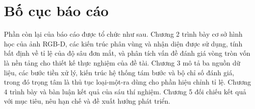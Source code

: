 \section{Bố cục báo cáo}

Phần còn lại của báo cáo được tổ chức như sau. Chương 2 trình bày cơ sở hình học của ảnh RGB-D, các kiến trúc phân vùng và nhận diện được sử dụng, tính bất định về tỉ lệ của độ sâu đơn mắt, và phân tích vấn đề đánh giá vòng tròn vốn là nền tảng cho thiết kế thực nghiệm của đề tài. Chương 3 mô tả ba nguồn dữ liệu, các bước tiền xử lý, kiến trúc hệ thống tám bước và bộ chỉ số đánh giá, trong đó trọng tâm là thủ tục loại-một-ra dùng cho phần hiệu chỉnh tỉ lệ. Chương 4 trình bày và bàn luận kết quả của sáu thí nghiệm. Chương 5 đối chiếu kết quả với mục tiêu, nêu hạn chế và đề xuất hướng phát triển.
